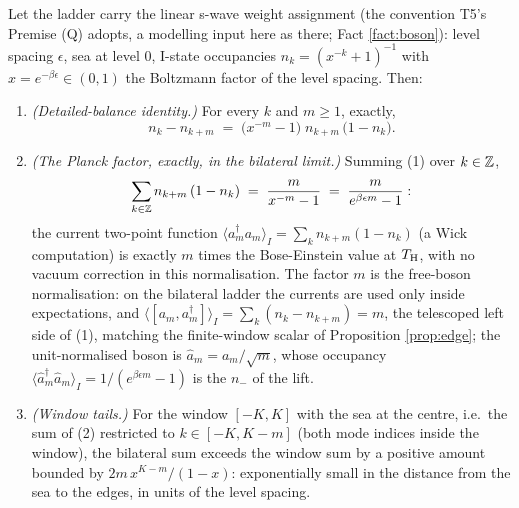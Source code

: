 \begin{proposition}\label{prop:planck}
Let the ladder carry the linear s-wave weight assignment (the convention T5's Premise (Q) adopts, a modelling input here as there; Fact \ref{fact:boson}): level spacing $\epsilon$, sea at level $0$, I-state occupancies $n_k = (x^{-k} + 1)^{-1}$ with $x = e^{-\beta\epsilon} \in (0,1)$ the Boltzmann factor of the level spacing. Then:
\begin{enumerate}
\item \emph{(Detailed-balance identity.)} For every $k$ and $m \ge 1$, exactly,
\[
n_k - n_{k+m} \;=\; \bigl(x^{-m} - 1\bigr)\; n_{k+m}\,\bigl(1 - n_k\bigr).
\]
\item \emph{(The Planck factor, exactly, in the bilateral limit.)} Summing (1) over $k \in \mathbb{Z}$,
\[
\sum_{k \in \mathbb{Z}} n_{k+m}\,(1 - n_k) \;=\; \frac{m}{x^{-m} - 1} \;=\; \frac{m}{e^{\beta\epsilon m} - 1}:
\]
the current two-point function $\langle a_m^\dagger a_m\rangle_I = \sum_k n_{k+m}(1 - n_k)$ (a Wick computation) is exactly $m$ times the Bose-Einstein value at $T_{\mathrm{H}}$, with no vacuum correction in this normalisation. The factor $m$ is the free-boson normalisation: on the bilateral ladder the currents are used only inside expectations, and $\langle [a_m, a_m^\dagger]\rangle_I = \sum_k (n_k - n_{k+m}) = m$, the telescoped left side of (1), matching the finite-window scalar of Proposition \ref{prop:edge}; the unit-normalised boson is $\hat a_m = a_m/\sqrt{m}$, whose occupancy $\langle \hat a_m^\dagger \hat a_m\rangle_I = 1/(e^{\beta\epsilon m} - 1)$ is the $n_-$ of the lift.
\item \emph{(Window tails.)} For the window $[-K, K]$ with the sea at the centre, i.e.\ the sum of (2) restricted to $k \in [-K, K-m]$ (both mode indices inside the window), the bilateral sum exceeds the window sum by a positive amount bounded by $2m\,x^{K - m}/(1 - x)$: exponentially small in the distance from the sea to the edges, in units of the level spacing.
\end{enumerate}
\end{proposition}

